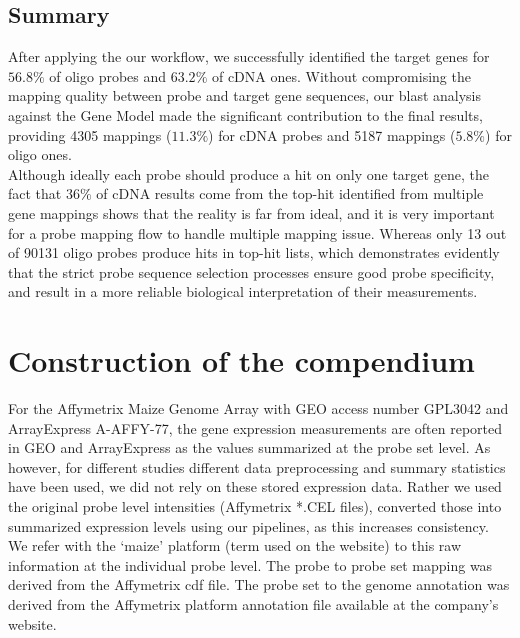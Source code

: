 \subsection*{Summary}

After applying the our workflow, we successfully identified the target genes 
for $56.8\%$ of oligo probes and $63.2\%$ of cDNA ones. 
Without compromising the mapping quality between probe and target gene 
sequences, our blast analysis against the Gene Model made the significant 
contribution to the final results, providing 4305 mappings ($11.3\%$) for cDNA 
probes and 5187 mappings ($5.8\%$) for oligo ones.
\\
Although ideally each probe should produce a hit on only one target 
gene, the fact that $36\%$ of cDNA results come from the top-hit identified 
from multiple gene mappings shows that the reality is far from ideal, and it is 
very important for a probe mapping flow to handle multiple mapping issue. 
Whereas only 13 out of 90131 oligo probes produce hits in top-hit lists, which 
demonstrates evidently that the strict probe sequence selection processes 
ensure good probe specificity, and result in a more reliable biological 
interpretation of their measurements.










\section{Construction of the compendium}

For the Affymetrix Maize Genome Array with GEO access number
GPL3042 and ArrayExpress A-AFFY-77, the gene expression
measurements are often reported in GEO and ArrayExpress as the
values summarized at the probe set level.  As however, for
different studies different data preprocessing and summary
statistics have been used, we did not rely on these stored
expression data. Rather we used the original probe level
intensities (Affymetrix *.CEL files), converted those into
summarized expression levels using our pipelines, as this
increases consistency. We refer with the ‘maize’ platform (term
used on the website) to this raw information at the individual
probe level.  The probe to probe set mapping was derived from the
Affymetrix cdf file. The probe set to the genome annotation was
derived from the Affymetrix platform annotation file available at
the company’s website.


